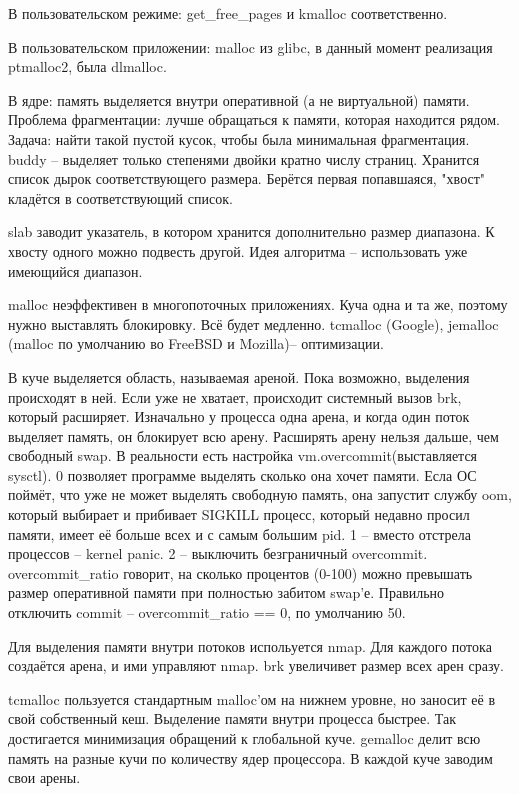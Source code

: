 \documentclass[a4paper,10pt]{article}
\begin{document}
В пользовательском режиме:
get\_free\_pages и kmalloc соответственно.

В пользовательском приложении: 
malloc из glibc, в данный момент реализация ptmalloc2, была dlmalloc.

В ядре:
память выделяется внутри оперативной (а не виртуальной) памяти. 
Проблема фрагментации: лучше обращаться к памяти, которая находится рядом.
Задача: найти такой пустой кусок, чтобы была минимальная фрагментация.
buddy -- выделяет только степенями двойки кратно числу страниц.
Хранится список дырок соответствующего размера. Берётся первая попавшаяся, "хвост" кладётся в соответствующий список.

slab заводит указатель, в котором хранится дополнительно размер диапазона. К хвосту одного можно подвесть другой.
Идея алгоритма -- использовать уже имеющийся диапазон.

malloc неэффективен в многопоточных приложениях. Куча одна и та же, поэтому нужно выставлять блокировку. Всё будет медленно.
tcmalloc (Google), jemalloc (malloc по умолчанию во FreeBSD и Mozilla)-- оптимизации.

В куче выделяется область, называемая ареной. Пока возможно, выделения происходят в ней. Если уже не хватает, происходит системный вызов brk, который расширяет.
Изначально у процесса одна арена, и когда один поток выделяет память, он блокирует всю арену. 
Расширять арену нельзя дальше, чем свободный swap. В реальности есть настройка vm.overcommit(выставляется sysctl).
0 позволяет программе выделять сколько она хочет памяти. Есла ОС поймёт, что уже не может выделять свободную память, она запустит службу oom, который выбирает и прибивает SIGKILL процесс, который недавно просил памяти, имеет её больше всех и с самым большим pid.
1 -- вместо отстрела процессов -- kernel panic.
2 -- выключить безграничный overcommit. overcommit\_ratio говорит, на сколько процентов (0-100) можно превышать размер оперативной памяти при полностью забитом swap'е.
Правильно отключить commit -- overcommit\_ratio == 0, по умолчанию 50.

Для выделения памяти внутри потоков испольуется nmap. Для каждого потока создаётся арена, и ими управляют nmap. brk увеличивет размер всех арен сразу.

tcmalloc пользуется стандартным malloc'ом на нижнем уровне, но заносит её в свой собственный кеш. Выделение памяти внутри процесса быстрее. Так достигается минимизация обращений к глобальной куче.
gemalloc делит всю память на разные кучи по количеству ядер процессора. В каждой куче заводим свои арены.
\end{document}
